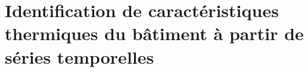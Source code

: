 \part{Identification de caractéristiques thermiques du bâtiment à partir de séries temporelles}\label{part:identification-de-caracteristiques-thermiques-du-batiment-a-partir-de-series-temporelles2}\label{part:identification-de-caracteristiques-thermiques-du-batiment-a-partir-de-series-temporelles}
    
    
    
